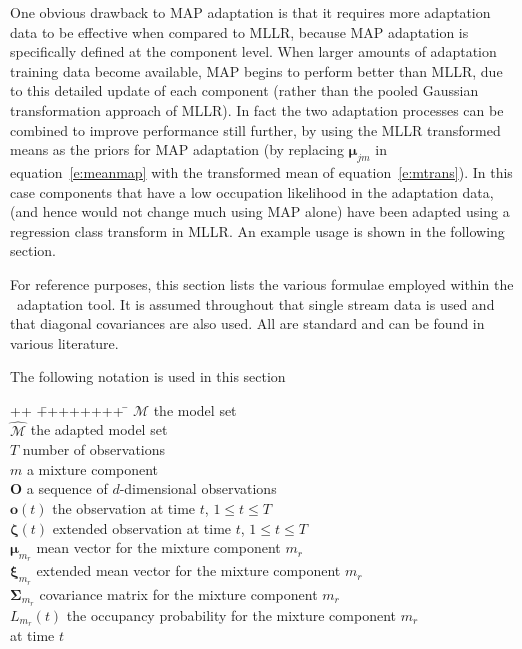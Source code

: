 One obvious drawback to MAP adaptation is that it requires more
adaptation data to be effective when compared to MLLR, because MAP
adaptation is specifically defined at the component level. When
larger amounts of adaptation training data become available, MAP
begins to perform better than MLLR, due to this detailed update of
each component (rather than the pooled Gaussian transformation
approach of MLLR). In fact the two adaptation processes can be
combined to improve performance still further, by using the MLLR
transformed means as the priors for MAP adaptation (by replacing
$\bm{\mu}_{jm}$ in equation~\ref{e:meanmap} with the transformed mean
of equation~\ref{e:mtrans}). In this case
components that have a low occupation likelihood in the adaptation
data, (and hence would not change much using MAP alone) have been
adapted using a regression class transform in MLLR. An example usage
is shown in the following section. 



For reference purposes, this section lists the various formulae
employed within the \HTK\ adaptation tool. It is assumed throughout
that single stream data is used and that diagonal covariances are also
used. All are standard and can be found in various literature.
 
The following notation is used in this section
\begin{tabbing}
++ \= ++++++++ \= \kill
\> $\mathcal{M}$ \> the model set\\
\> $\hat{\mathcal{M}}$ \> the adapted model set\\
\> $T$ \> number of observations \\
\> $m$ \> a mixture component \\
\> $\bm{O}$      \> a sequence of $d$-dimensional observations \\
\> $\bm{o}(t)$    \> the observation at time $t$, $1 \leq t \leq T $\\
\> $\bm{\zeta}(t)$\> extended observation at time $t$, $1 \leq t \leq T $
\\
\> $\bm{\mu}_{m_r}$  \> mean vector for the mixture component $m_r$\\
\> $\bm{\xi}_{m_r}$  \> extended mean vector for the mixture component $m_r$\\
\> $\bm{\Sigma}_{m_r}$  \> covariance matrix for the mixture component $m_r$ \\
\> $L_{m_r}(t)$ \> the occupancy probability for the mixture component $m_r$\\
\>              \>   at time $t$        
\end{tabbing}


